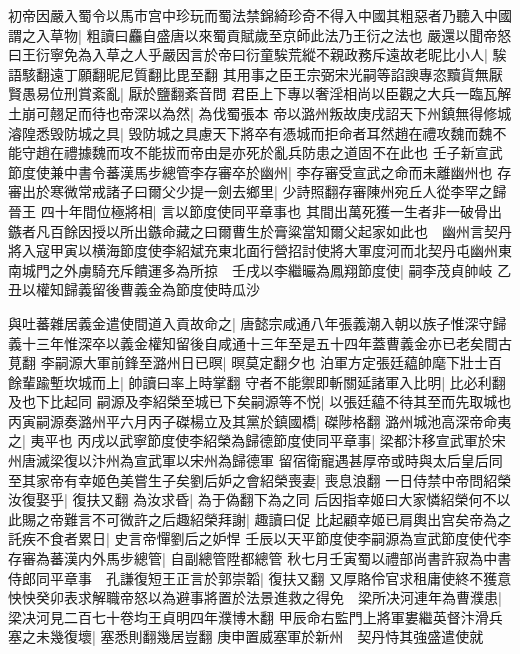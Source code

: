 初帝因嚴入蜀令以馬市宫中珍玩而蜀法禁錦綺珍奇不得入中國其粗惡者乃聽入中國謂之入草物|{
	粗讀曰麤自盛唐以來蜀貢賦歲至京師此法乃王衍之法也}
嚴還以聞帝怒曰王衍寧免為入草之人乎嚴因言於帝曰衍童騃荒縱不親政務斥遠故老昵比小人|{
	騃語駭翻遠丁願翻昵尼質翻比毘至翻}
其用事之臣王宗弼宋光嗣等諂諛專恣黷貨無厭賢愚易位刑賞紊亂|{
	厭於鹽翻紊音問}
君臣上下專以奢淫相尚以臣觀之大兵一臨瓦解土崩可翹足而待也帝深以為然|{
	為伐蜀張本}
帝以潞州叛故庚戌詔天下州鎮無得修城濬隍悉毁防城之具|{
	毁防城之具慮天下將卒有憑城而拒命者耳然趙在禮攻魏而魏不能守趙在禮據魏而攻不能拔而帝由是亦死於亂兵防患之道固不在此也}
壬子新宣武節度使兼中書令蕃漢馬步總管李存審卒於幽州|{
	李存審受宣武之命而未離幽州也}
存審出於寒微常戒諸子曰爾父少提一劍去鄉里|{
	少詩照翻存審陳州宛丘人從李罕之歸晉王}
四十年間位極將相|{
	言以節度使同平章事也}
其間出萬死獲一生者非一破骨出鏃者凡百餘因授以所出鏃命藏之曰爾曹生於膏粱當知爾父起家如此也　幽州言契丹將入寇甲寅以横海節度使李紹斌充東北面行營招討使將大軍度河而北契丹屯幽州東南城門之外虜騎充斥饋運多為所掠　壬戌以李繼曮為鳳翔節度使|{
	嗣李茂貞帥岐}
乙丑以權知歸義留後曹義金為節度使時瓜沙

與吐蕃雜居義金遣使間道入貢故命之|{
	唐懿宗咸通八年張義潮入朝以族子惟深守歸義十三年惟深卒以義金權知留後自咸通十三年至是五十四年蓋曹義金亦已老矣間古莧翻}
李嗣源大軍前鋒至潞州日已暝|{
	暝莫定翻夕也}
泊軍方定張廷藴帥麾下壯士百餘輩踰塹坎城而上|{
	帥讀曰率上時掌翻}
守者不能禦即斬關延諸軍入比明|{
	比必利翻及也下比起同}
嗣源及李紹榮至城已下矣嗣源等不悦|{
	以張廷藴不待其至而先取城也}
丙寅嗣源奏潞州平六月丙子磔楊立及其黨於鎮國橋|{
	磔陟格翻}
潞州城池高深帝命夷之|{
	夷平也}
丙戌以武寧節度使李紹榮為歸德節度使同平章事|{
	梁都汴移宣武軍於宋州唐滅梁復以汴州為宣武軍以宋州為歸德軍}
留宿衛寵遇甚厚帝或時與太后皇后同至其家帝有幸姬色美嘗生子矣劉后妒之會紹榮喪妻|{
	喪息浪翻}
一日侍禁中帝問紹榮汝復娶乎|{
	復扶又翻}
為汝求昏|{
	為于偽翻下為之同}
后因指幸姬曰大家憐紹榮何不以此賜之帝難言不可微許之后趣紹榮拜謝|{
	趣讀曰促}
比起顧幸姬已肩輿出宫矣帝為之託疾不食者累日|{
	史言帝憚劉后之妒悍}
壬辰以天平節度使李嗣源為宣武節度使代李存審為蕃漢内外馬步總管|{
	自副總管陞都總管}
秋七月壬寅蜀以禮部尚書許寂為中書侍郎同平章事　孔謙復短王正言於郭崇韜|{
	復扶又翻}
又厚賂伶官求租庸使終不獲意怏怏癸卯表求解職帝怒以為避事將置於法景進救之得免　梁所决河連年為曹濮患|{
	梁决河見二百七十卷均王貞明四年濮博木翻}
甲辰命右監門上將軍婁繼英督汴滑兵塞之未幾復壞|{
	塞悉則翻幾居豈翻}
庚申置威塞軍於新州　契丹恃其強盛遣使就

